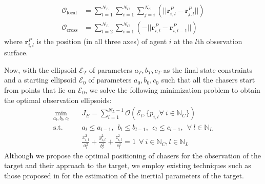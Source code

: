 {\begin{align}
    {\mathcal{O}}_{\text{local}}&=\sum_{l=1}^{N_L}\sum_{i=1}^{N_C}\sum_{j=i}^{N_C}\left(||\boldsymbol{r}_{i,l}^P-\boldsymbol{r}_{j,l}^P||\right)\\
    {\mathcal{O}}_{\text{cross}}&=\sum_{l=2}^{N_L}\sum_{i=1}^{N_C}\left(-||\boldsymbol{r}_{i,l}^P-\boldsymbol{r}_{i,l-1}^P||\right)
\end{align}
where $\boldsymbol{r}_{i,l}^P$ is the position (in all three axes) of agent $i$ at the $l$th observation surface.

Now, with the ellipsoid ${\mathcal{E}}_T$ of parameters $a_T, b_T, c_T$ as the final state constraints and a starting ellipsoid ${\mathcal{E}}_0$ of parameters $a_0, b_0, c_0$ such that all the chasers start from points that lie on $\mathcal{E}_0$, we solve the following minimization problem to obtain the optimal observation ellipsoids:
\begin{equation}
\begin{aligned}
    \min_{a_l, b_l, c_l}\quad &J_E=\sum_{l=1}^{N_L-1}{\mathcal{O}}({\mathcal{E}}_l, \{p_{i,l} \forall\ i\in{\mathbb{N}}_C\})\\
    \textrm{s.t. } & a_{l}\leq a_{l-1},\ \ b_{l}\leq b_{l-1},\ \  c_{l}\leq c_{l-1},\ \ \forall\ l\in{\mathbb{N}}_L\\
    & \frac{x_{i,l}^2}{a_l^2}+\frac{y_{i,l}^2}{b_l^2}+\frac{z_{i,l}^2}{c_l^2}=1\ \ \forall\ i\in{\mathbb{N}}_C, l\in{\mathbb{N}}_L
    \label{eqn:mee}
\end{aligned}
\end{equation}
Although we propose the optimal positioning of chasers for the observation of the target and their approach to the target, we employ existing techniques such as those proposed in \cite{setterfield2018inertial} for the estimation of the inertial parameters of the target.
}

